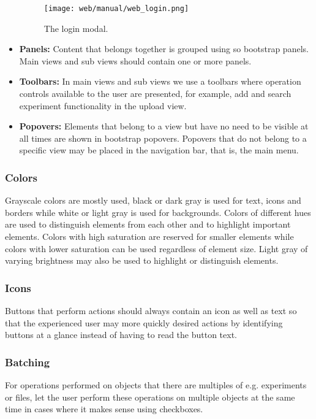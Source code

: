 \begin{itemize}
\begin{figure}
\centering
\texttt{[image: web/manual/web\_login.png]}
\caption{The login modal.}
\label{fig:web_search_login1}
\end{figure}

    \item \textbf{Panels:}
Content that belongs together is grouped using so bootstrap panels. Main views and sub views should contain one or more panels.
    
    \item \textbf{Toolbars:}
In main views and sub views we use a toolbars where operation controls available to the user are presented, for example, add and search experiment functionality in the upload view.
    
    \item \textbf{Popovers:}
Elements that belong to a view but have no need to be visible at all times are shown in bootstrap popovers. Popovers that do not belong to a specific view may be placed in the navigation bar, that is, the main menu.
\end{itemize}

\subsubsection{Colors}
Grayscale colors are mostly used, black or dark gray is used for text, icons and borders while white or light gray is used for backgrounds. Colors of different hues are used to distinguish elements from each other and to highlight important elements. Colors with high saturation are reserved for smaller elements while colors with lower saturation can be used regardless of element size. Light gray of varying brightness may also be used to highlight or distinguish elements.

\subsubsection{Icons}
Buttons that perform actions should always contain an icon as well as text so that the experienced user may more quickly desired actions by identifying buttons at a glance instead of having to read the button text. 

\subsubsection{Batching}
For operations performed on objects that there are multiples of e.g. experiments or files, let the user perform these operations on multiple objects at the same time in cases where it makes sense using checkboxes.

